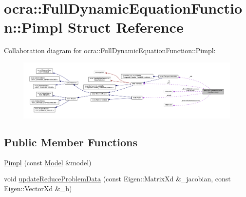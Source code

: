 \hypertarget{structFullDynamicEquationFunction_1_1Pimpl}{}\section{ocra\+:\+:Full\+Dynamic\+Equation\+Function\+:\+:Pimpl Struct Reference}
\label{structFullDynamicEquationFunction_1_1Pimpl}


Collaboration diagram for ocra\+:\+:Full\+Dynamic\+Equation\+Function\+:\+:Pimpl\+:
\nopagebreak
\begin{figure}[H]
\begin{center}
\leavevmode
\includegraphics[width=350pt]{d6/d01/structFullDynamicEquationFunction_1_1Pimpl__coll__graph}
\end{center}
\end{figure}
\subsection*{Public Member Functions}
\begin{DoxyCompactItemize}
\item 
\hyperlink{structFullDynamicEquationFunction_1_1Pimpl_acc3b35606d52aa163f27d80f49cb3aaf}{Pimpl} (const \hyperlink{classocra_1_1Model}{Model} \&model)
\item 
void \hyperlink{structFullDynamicEquationFunction_1_1Pimpl_a4d1df4cadec603942aeb750212a2d258}{update\+Reduce\+Problem\+Data} (const Eigen\+::\+Matrix\+Xd \&\+\_\+jacobian, const Eigen\+::\+Vector\+Xd \&\+\_\+b)
\end{DoxyCompactItemize}

